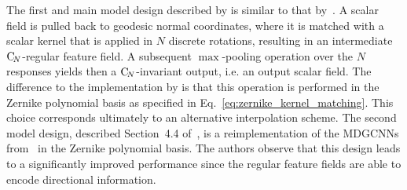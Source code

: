 The first and main model design described by \citet{sun2018zernet} is similar to that by~\citet{masci2015geodesic}.
A scalar field is pulled back to geodesic normal coordinates, where it is matched with a scalar kernel that is applied in $N$ discrete rotations, resulting in an intermediate $\operatorname{C}_{\!N}$-regular feature field.
A subsequent $\max$-pooling operation over the $N$ responses yields then a $\operatorname{C}_{\!N}$-invariant output, i.e. an output scalar field.
The difference to the implementation by \citet{masci2015geodesic} is that this operation is performed in the Zernike polynomial basis as specified in Eq.~\eqref{eq:zernike_kernel_matching}.
This choice corresponds ultimately to an alternative interpolation scheme.
The second model design, described Section~4.4 of~\cite{sun2018zernet}, is a reimplementation of the MDGCNNs from~\citet{poulenard2018multi} in the Zernike polynomial basis.
The authors observe that this design leads to a significantly improved performance since the regular feature fields are able to encode directional information.





